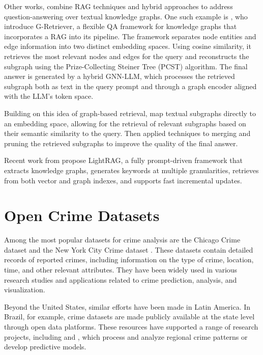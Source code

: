 Other works, combine RAG techniques and hybrid approaches to address question-answering over textual knowledge graphs. One such example is \cite{He2024GRetriever}, who introduce G-Retriever, a flexible QA framework for knowledge graphs that incorporates a RAG into its pipeline. The framework separates node entities and edge information into two distinct embedding spaces. Using cosine similarity, it retrieves the most relevant nodes and edges for the query and reconstructs the subgraph using the Prize-Collecting Steiner Tree (PCST) algorithm. The final answer is generated by a hybrid GNN-LLM, which processes the retrieved subgraph both as text in the query prompt and through a graph encoder aligned with the LLM's token space.

Building on this idea of graph-based retrieval, \cite{Hu2024GRAG} map textual subgraphs directly to an embedding space, allowing for the retrieval of relevant subgraphs based on their semantic similarity to the query. Then applied techniques to merging and pruning the retrieved subgraphs to improve the quality of the final answer. 

Recent work from \cite{Guo2024LightRAG} propose LightRAG, a fully prompt-driven framework that extracts knowledge graphs, generates keywords at multiple granularities, retrieves from both vector and graph indexes, and supports fast incremental updates.




\section{Open Crime Datasets}

Among the most popular datasets for crime analysis are the Chicago Crime dataset \cite{ChicagoDataset} and the New York City Crime dataset \cite{NYCDataset}. These datasets contain detailed records of reported crimes, including information on the type of crime, location, time, and other relevant attributes. They have been widely used in various research studies and applications related to crime prediction, analysis, and visualization.

Beyond the United States, similar efforts have been made in Latin America. In Brazil, for example, crime datasets are made publicly available at the state level through open data platforms. These resources have supported a range of research projects, including \cite{Garcia2022CriPAV} and \cite{Waqar2025CrimePredictionGNN}, which process and analyze regional crime patterns or develop predictive models.

